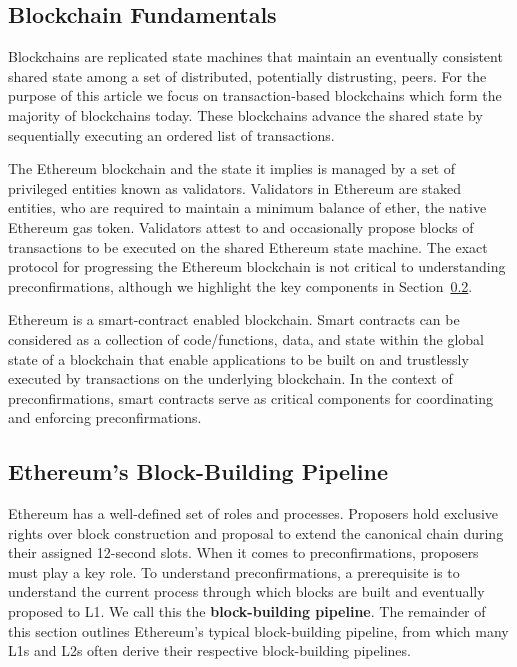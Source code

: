\documentclass[a4paper]{article}
\theoremstyle{boldstyle}
\begin{document}
    \subsection{Blockchain Fundamentals}
    Blockchains are replicated state machines that maintain an eventually consistent shared state among a set of distributed, potentially distrusting, peers. For the purpose of this article we focus on transaction-based blockchains which form the majority of blockchains today. These blockchains advance the shared state by sequentially executing an ordered list of transactions. 
    
    The Ethereum blockchain and the state it implies is managed by a set of privileged entities known as validators. Validators in Ethereum are staked entities, who are required to maintain a minimum balance of ether, the native Ethereum gas token. Validators attest to and occasionally propose blocks of transactions to be executed on the shared Ethereum state machine. The exact protocol for progressing the Ethereum blockchain is not critical to understanding preconfirmations, although we highlight the key components in Section~\ref{sec:L1_pipeline}.

    Ethereum is a smart-contract enabled blockchain. Smart contracts can be considered as a collection of code/functions, data, and state within the global state of a blockchain \cite{W:IntroductionToSmartContracts} that enable applications to be built on and trustlessly executed by transactions on the underlying blockchain. In the context of preconfirmations, smart contracts serve as critical components for coordinating and enforcing preconfirmations.
    
    \subsection{Ethereum's Block-Building Pipeline}
    \label{sec:L1_pipeline}
    Ethereum has a well-defined set of roles and processes. Proposers hold exclusive rights over block construction and proposal to extend the canonical chain during their assigned 12-second slots. When it comes to preconfirmations, proposers must play a key role. To understand preconfirmations, a prerequisite is to understand the current process through which blocks are built and eventually proposed to L1. We call this the \textbf{block-building pipeline}. The remainder of this section outlines Ethereum's typical block-building pipeline, from which many L1s and L2s often derive their respective block-building pipelines. \\
    
\end{document}

